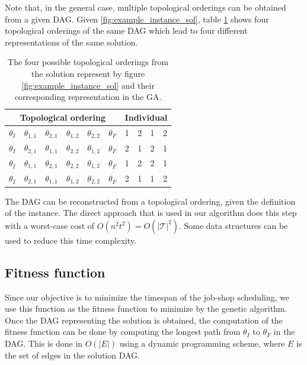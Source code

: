 \documentclass[10pt,a4paper]{article}
\begin{document}
Note that, in the general case, multiple topological orderings can be obtained from a given DAG. Given \ref{fig:example_instance_sol}, table \ref{tab:example_instance_sols} shows four topological orderings of the same DAG which lead to four different representations of the same solution.

\begin{table}[h]
\centering
\begin{tabular}{|cccccc|cccc|}
\hline
\multicolumn{6}{|c|}{Topological ordering} & \multicolumn{4}{|c|}{Individual}\\
\hline
$\theta_I$ & $\theta_{1,1}$ & $\theta_{2,1}$ & $\theta_{1,2}$ & $\theta_{2,2}$ & $\theta_F$ & 1 & 2 & 1 & 2 \\
\hline
$\theta_I$ & $\theta_{2,1}$ & $\theta_{1,1}$ & $\theta_{2,2}$ & $\theta_{1,2}$ & $\theta_F$ & 2 & 1 & 2 & 1 \\
\hline
$\theta_I$ & $\theta_{1,1}$ & $\theta_{2,1}$ & $\theta_{2,2}$ & $\theta_{1,2}$ & $\theta_F$ & 1 & 2 & 2 & 1 \\
\hline
$\theta_I$ & $\theta_{2,1}$ & $\theta_{1,1}$ & $\theta_{1,2}$ & $\theta_{2,2}$ & $\theta_F$ & 2 & 1 & 1 & 2\\
\hline
\end{tabular}
\caption{The four possible topological orderings from the solution represent by figure \ref{fig:example_instance_sol} and their corresponding representation in the GA.}
\label{tab:example_instance_sols}
\end{table}

The DAG can be reconstructed from a topological ordering, given the definition of the instance. The direct approach that is used in our algorithm does this step with a worst-case cost of $O(n^2 t^2) = O(|\mathcal{T}|^2)$. Some data structures can be used to reduce this time complexity.

\subsection{Fitness function}
Since our objective is to minimize the timespan of the job-shop scheduling, we use this function as the fitness function to minimize by the genetic algorithm. Once the DAG representing the solution is obtained, the computation of the fitness function can be done by computing the longest path from $\theta_I$ to $\theta_F$ in the DAG. This is done in $O(|E|)$ using a dynamic programming scheme, where $E$ is the set of edges in the solution DAG.
\end{document}

